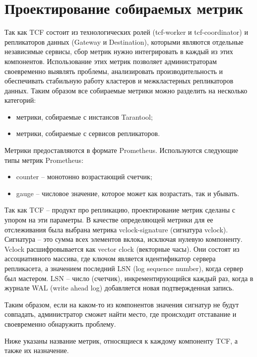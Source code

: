 \section{Проектирование собираемых метрик}

Так как TCF состоит из технологических ролей (tcf-worker и tcf-coordinator) и репликаторов данных
(Gateway и Destination), которыми
являются отдельные независимые сервисы, сбор метрик нужно интегрировать в каждый из этих компонентов.
Использование этих метрик позволяет администраторам своевременно выявлять проблемы, анализировать
производительность и обеспечивать стабильную работу кластеров и межкластерных репликаторов данных. Таким
образом все собираемые метрики можно разделить на несколько категорий:

\begin{itemize}
  \item метрики, собираемые с инстансов Tarantool;
  \item метрики, собираемые с сервисов репликаторов.
\end{itemize}

Метрики предоставляются в формате Prometheus. Используются следующие типы метрик Prometheus:

\begin{itemize}
  \item counter -- монотонно возрастающий счетчик;
  \item gauge -- числовое значение, которое может как возрастать, так и убывать.
\end{itemize}

Так как TCF -- продукт про репликацию, проектирование метрик сделаны с упором на эти параметры.
В качестве определяющей метрики для ее отслеживания была выбрана метрика vclock-signature (сигнатура
vclock). Сигнатура -- это сумма всех элементов вклока, исключая нулевую компоненту. Vclock расшифровывается
как vector clock (векторные часы). Они состоят из ассоциативного массива, где ключом является
идентификатор сервера репликасета, а значением последний LSN (log sequence number), когда сервер был
мастером. LSN -- число (счетчик), инкрементирующийся каждый раз, когда в журнале WAL (write ahead log)
добавляется новая подтвержденная запись.

Таким образом, если на каком-то из компонентов значения сигнатур не будут совпадать, администратор сможет
найти место, где происходит отставание и своевременно обнаружить проблему.

Ниже указаны название метрик, относящиеся к каждому компоненту TCF, а также их назначение. 

